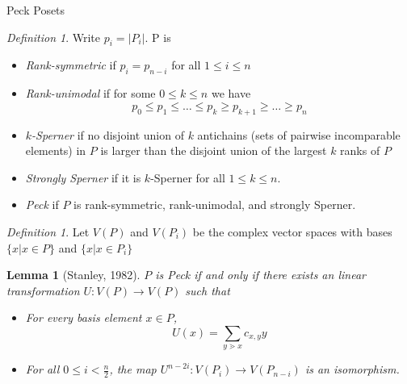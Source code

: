\documentclass{beamer}
\newtheorem{lem}[thm]{Lemma}
\theoremstyle{remark}
\newtheorem{defn}[thm]{Definition}
\begin{document}
\begin{frame}{Peck Posets}
\begin{defn}
Write $p_i = |P_i|$.  P is
\begin{itemize}

\item \textit{Rank-symmetric} if $p_i = p_{n-i}$ for all $1\le i\le n$

\item \textit{Rank-unimodal} if for some $0\le k\le n$ we have
$$p_0\le p_1\le \ldots \le p_k \ge p_{k+1} \ge\ldots \ge p_n$$

\item \textit{$k$-Sperner} if no disjoint union of $k$ antichains (sets of pairwise incomparable elements) in $P$ is larger than the disjoint union of the largest $k$ ranks of $P$

\item \textit{Strongly Sperner} if it is $k$-Sperner for all $1\le k\le n$.

\item \textit{Peck} if $P$ is rank-symmetric, rank-unimodal, and strongly Sperner.
\end{itemize}
\end{defn}
\end{frame}







\begin{frame}

\begin{defn}
Let $V(P)$ and $V(P_i)$ be the complex vector spaces with bases $\{x |x\in P\}$ and $\{x |x\in P_i\}$
\end{defn}

\begin{lem}[Stanley, 1982]
$P$ is Peck if and only if there exists an linear transformation $U\colon V(P)\rightarrow V(P)$ such that
\begin{itemize}
\item For every basis element $x\in P$, 
$$U(x) = \sum_{y\gtrdot x} c_{x,y}y$$

\item  For all $0\le i < \frac{n}{2}$, the map $U^{n-2i}\colon V(P_i)\rightarrow V(P_{n-i})$ is an isomorphism.
\end{itemize}
\end{lem}
\end{frame}
\end{document}
